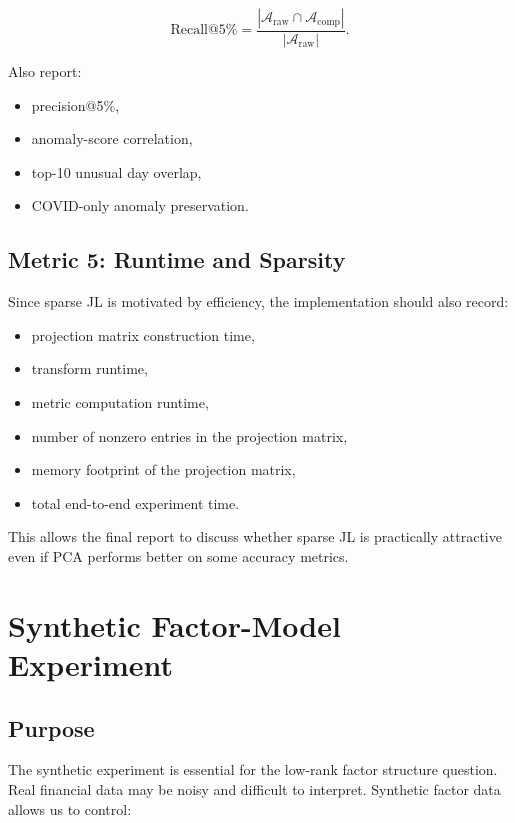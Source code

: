 \documentclass[11pt]{article}
\begin{document}
\[
\text{Recall@5\%}
=
\frac{
|\mathcal{A}_{\text{raw}} \cap \mathcal{A}_{\text{comp}}|
}{
|\mathcal{A}_{\text{raw}}|
}.
\]

Also report:

\begin{itemize}
    \item precision@5\%,
    \item anomaly-score correlation,
    \item top-10 unusual day overlap,
    \item COVID-only anomaly preservation.
\end{itemize}

\subsection{Metric 5: Runtime and Sparsity}

Since sparse JL is motivated by efficiency, the implementation should also record:

\begin{itemize}
    \item projection matrix construction time,
    \item transform runtime,
    \item metric computation runtime,
    \item number of nonzero entries in the projection matrix,
    \item memory footprint of the projection matrix,
    \item total end-to-end experiment time.
\end{itemize}

This allows the final report to discuss whether sparse JL is practically attractive even if PCA performs better on some accuracy metrics.

\section{Synthetic Factor-Model Experiment}

\subsection{Purpose}

The synthetic experiment is essential for the low-rank factor structure question. Real financial data may be noisy and difficult to interpret. Synthetic factor data allows us to control:
\end{document}
